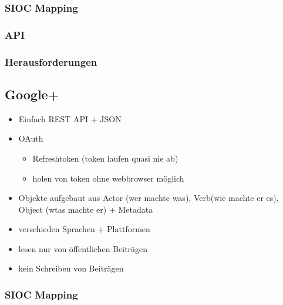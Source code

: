 \subsubsection{SIOC Mapping} %
\label{ssub:facebook_sioc_mapping}

\subsubsection{API} %
\label{ssub:facebook_api}

\subsubsection{Herausforderungen} %
\label{ssub:facebook_herausforderungen}





\subsection{Google+} %
\label{sub:google_plus_connector}

\begin{itemize}
    \item Einfach REST API + JSON
    \item OAuth
    \begin{itemize}
        \item Refreshtoken (token laufen quasi nie ab)
        \item holen von token ohne webbrowser möglich
    \end{itemize}
    \item Objekte aufgebaut aus Actor (wer machte was), Verb(wie machte er es), Object (wtas machte er) + Metadata
    \item verschieden Sprachen + Plattformen
    \item lesen nur von öffentlichen Beiträgen
    \item kein Schreiben von Beiträgen
\end{itemize}

\subsubsection{SIOC Mapping} %
\label{ssub:google_plus_sioc_mapping}


